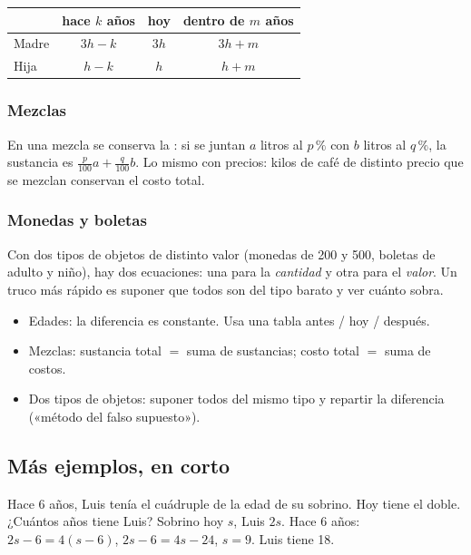 \begin{center}
\begin{tabular}{lccc}
\toprule
 & hace $k$ años & hoy & dentro de $m$ años\\\midrule
Madre & $3h - k$ & $3h$ & $3h + m$\\
Hija & $h - k$ & $h$ & $h + m$\\\bottomrule
\end{tabular}
\end{center}

\subsubsection{Mezclas}
En una mezcla se conserva la : si se juntan $a$ litros al $p\,\%$ con $b$ litros al
$q\,\%$, la sustancia es $\tfrac{p}{100}a + \tfrac{q}{100}b$. Lo mismo con precios: kilos de café de distinto
precio que se mezclan conservan el costo total.

\subsubsection{Monedas y boletas}
Con dos tipos de objetos de distinto valor (monedas de 200 y 500, boletas de adulto y niño), hay dos ecuaciones: una
para la \emph{cantidad} y otra para el \emph{valor}. Un truco más rápido es suponer que todos son del tipo barato y ver
cuánto sobra.

\begin{regla}
\begin{itemize}
  \item Edades: la diferencia es constante. Usa una tabla antes / hoy / después.
  \item Mezclas: sustancia total $=$ suma de sustancias; costo total $=$ suma de costos.
  \item Dos tipos de objetos: suponer todos del mismo tipo y repartir la diferencia («método del falso supuesto»).
\end{itemize}
\end{regla}

\subsection{Más ejemplos, en corto}
\begin{ejemplo}
Hace 6 años, Luis tenía el cuádruple de la edad de su sobrino. Hoy tiene el doble. ¿Cuántos años tiene Luis?
\solucion Sobrino hoy $s$, Luis $2s$. Hace 6 años: $2s - 6 = 4(s - 6)$, $2s - 6 = 4s - 24$, $s = 9$. Luis tiene 18.
\end{ejemplo}

